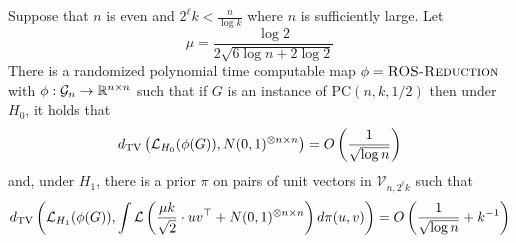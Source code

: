\begin{lemma} \label{lem:ros}
Suppose that $n$ is even and $2^{\ell} k < \frac{n}{\log k}$ where $n$ is sufficiently large. Let
$$\mu = \frac{\log 2}{2 \sqrt{6 \log n + 2\log 2}}$$
There is a randomized polynomial time computable map $\phi = \textsc{ROS-Reduction}$ with $\phi : \mathcal{G}_n \to \mathbb{R}^{n \times n}$ such that if $G$ is an instance of $\text{PC}(n, k, 1/2)$ then under $H_0$, it holds that
$$d_{\text{TV}}\left( \mathcal{L}_{H_0}(\phi(G)), N(0, 1)^{\otimes n \times n} \right) = O\left( \frac{1}{\sqrt{\log n}} \right)$$
and, under $H_1$, there is a prior $\pi$ on pairs of unit vectors in $\mathcal{V}_{n, 2^\ell k}$ such that
$$d_{\text{TV}}\left( \mathcal{L}_{H_1}(\phi(G)), \int \mathcal{L}\left( \frac{\mu k}{\sqrt{2}} \cdot  uv^\top + N(0, 1)^{\otimes n \times n} \right) d\pi(u, v) \right) = O\left( \frac{1}{\sqrt{\log n}} + k^{-1} \right)$$
\end{lemma}

